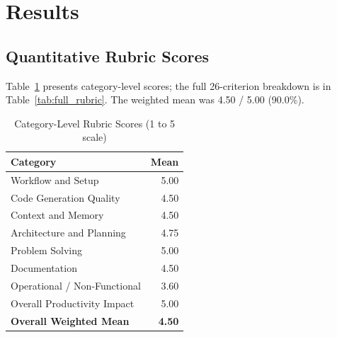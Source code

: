 \documentclass[conference]{IEEEtran}
\begin{document}
\section{Results}

\subsection{Quantitative Rubric Scores}
Table~\ref{tab:category_scores} presents category-level scores; the full 26-criterion breakdown is in Table~\ref{tab:full_rubric}. The weighted mean was 4.50 / 5.00 (90.0\%).

\begin{table}[!htbp]
\caption{Category-Level Rubric Scores (1 to 5 scale)}
\label{tab:category_scores}
\centering
\setlength{\tabcolsep}{4pt}
\begin{tabular}{@{}lr@{}}
\toprule
\textbf{Category} & \textbf{Mean} \\
\midrule
Workflow and Setup & 5.00 \\
Code Generation Quality & 4.50 \\
Context and Memory & 4.50 \\
Architecture and Planning & 4.75 \\
Problem Solving & 5.00 \\
Documentation & 4.50 \\
Operational / Non-Functional & 3.60 \\
Overall Productivity Impact & 5.00 \\
\midrule
\textbf{Overall Weighted Mean} & \textbf{4.50} \\
\bottomrule
\end{tabular}
\end{table}
\end{document}
